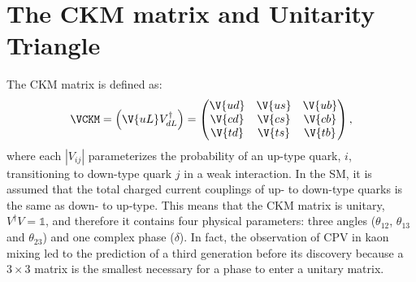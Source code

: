 \section{The CKM matrix and Unitarity Triangle}
\label{sec:ckm}

The CKM matrix is defined as:
\begin{equation}
  \VCKM = \left(\V{uL}V_{dL}^\dagger\right) =
  \begin{pmatrix}
    \V{ud} & \V{us} & \V{ub} \\
    \V{cd} & \V{cs} & \V{cb} \\
    \V{td} & \V{ts} & \V{tb} \\
  \end{pmatrix},
\end{equation}
where each $|V_{ij}|$ parameterizes the probability of an up-type quark, $i$, transitioning to
down-type quark $j$ in a weak interaction.
In the SM, it is assumed that the total charged current couplings of up- to down-type quarks is the
same as down- to up-type.
This means that the CKM matrix is unitary, $V^\dagger V = \mathbb{1}$, and therefore it contains
four physical parameters: three angles ($\theta_{12}$, $\theta_{13}$ and $\theta_{23}$) and one
complex phase ($\delta$).
In fact, the observation of CPV in kaon mixing led to the prediction of a third generation before
its discovery because a $3\times3$ matrix is the smallest necessary for a phase to enter a unitary
matrix.



